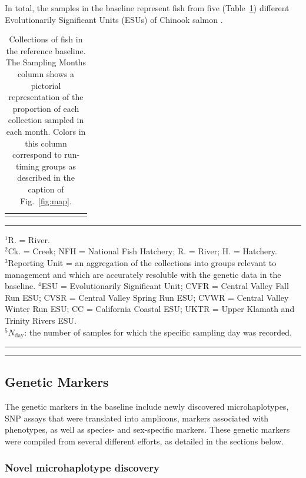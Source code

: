 In total, the samples in the baseline represent fish from five (Table~\ref{tab:samples}) different Evolutionarily Significant
Units (ESUs) of Chinook salmon \citep{waples1991pacific}.
\begin{table}
\caption{\footnotesize Collections of fish in the reference baseline.  The Sampling Months column shows
a pictorial representation of the proportion of each collection sampled in each month.  Colors in
this column correspond to run-timing groups as described in the caption of Fig.~\protect\ref{fig:map}.}
\label{tab:samples}
{\small
\begin{tabular*}{\linewidth}{@{\extracolsep{\fill}} lllllllrcr}
\hline\hline
\vspace*{0.4ex}

\end{tabular*}
}
\rule{3cm}{0.3pt}

{\scriptsize
$^1$R. = River.\\
$^2$Ck. = Creek; NFH = National Fish Hatchery; R. = River; H. = Hatchery.\\
$^3$Reporting Unit = an aggregation of the collections into groups relevant to management and
which are accurately resoluble with the genetic data in the baseline.
$^4$ESU = Evolutionarily Significant Unit; CVFR = Central Valley Fall Run ESU; CVSR = Central Valley Spring Run ESU; CVWR =
Central Valley Winter Run ESU; CC = California Coastal ESU; UKTR = Upper Klamath and Trinity Rivers ESU. \\
$^5N_\mathrm{day}$: the number of samples for which the specific sampling day was recorded.
}
\hrule\vspace*{0.3ex}\hrule
\end{table}

\subsection*{Genetic Markers}

The genetic markers in the baseline include newly discovered microhaplotypes, SNP assays
that were translated into amplicons, markers associated with phenotypes, as well
as species- and sex-specific markers.
These genetic markers were compiled from several different
efforts, as detailed in the sections below.

\subsubsection*{Novel microhaplotype discovery}

